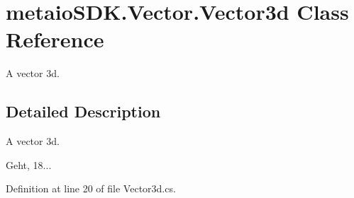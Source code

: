 \section{metaio\-S\-D\-K.\-Vector.\-Vector3d Class Reference}
\label{classmetaio_s_d_k_1_1_vector_1_1_vector3d}


A vector 3d.  




\subsection{Detailed Description}
A vector 3d. 

Geht, 18... 

Definition at line 20 of file Vector3d.\-cs.


